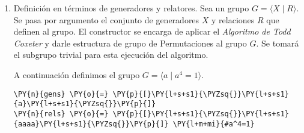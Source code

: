 \begin{itemize}
\begin{itemize}
\begin{enumerate}
    
    \begin{tcolorbox}[breakable, size=fbox, boxrule=1pt, pad at break*=1mm,colback=cellbackground, colframe=cellborder]
\begin{Verbatim}[commandchars=\\\{\}]
\PY{n}{S} \PY{o}{=} \PY{n}{Set}\PY{p}{(}\PY{p}{\PYZob{}}\PY{l+m+mi}{0}\PY{p}{,}\PY{l+m+mi}{1}\PY{p}{,}\PY{l+m+mi}{2}\PY{p}{,}\PY{l+m+mi}{3}\PY{p}{\PYZcb{}}\PY{p}{)}
\PY{n}{F}\PY{o} {=} \PY{n}{Function}\PY{p}{(}\PY{n}{S}\PY{o}{*}\PY{n}{S}\PY{p}{,} \PY{n}{S}\PY{p}{,}\PY{k}{lambda} \PY{n}{x}\PY{p}{:} \PY{p}{(}\PY{n}{x}\PY{p}{[}\PY{l+m+mi}{0}\PY{p}{]}\PY{o}{+}\PY{n}{x}\PY{p}{[}\PY{l+m+mi}{1}\PY{p}{]}\PY{p}{)}\PY{o}{\PYZpc{}}\PY{k}{4})
\PY{n}{Z4} \PY{o}{=} \PY{n}{Group}\PY{p}{(}\PY{n}{S}\PY{p}{,}\PY{n}{F}\PY{p}{)}

\PY{n+nb}{print}\PY{p}{(}\PY{n}{Z4}\PY{p}{)}
\end{Verbatim}
\end{tcolorbox}

\begin{tcolorbox}[breakable, size=fbox, boxrule=.5pt, pad at break*=1mm, opacityfill=0]
    \begin{Verbatim}[commandchars=\\\{\}]
Group with 4 elements: \{0, 1, 2, 3\}
    \end{Verbatim}
\end{tcolorbox}

\item Definición en términos de generadores y relatores. Sea un grupo $G = \langle X \mid R\rangle$. Se pasa por argumento el conjunto de generadores $X$ y relaciones $R$ que definen al grupo. El constructor se encarga de aplicar el \textit{Algoritmo de Todd Coxeter} y darle estructura de grupo de Permutaciones al grupo $G$. Se tomará el subgrupo trivial para esta ejecución del algoritmo.


A continuación definimos el grupo $G= \langle a \mid a^4 =1 \rangle$.
    \begin{tcolorbox}[breakable, size=fbox, boxrule=1pt, pad at break*=1mm,colback=cellbackground, colframe=cellborder]
\begin{Verbatim}[commandchars=\\\{\}]
\PY{n}{gens} \PY{o}{=} \PY{p}{[}\PY{l+s+s1}{\PYZsq{}}\PY{l+s+s1}{a}\PY{l+s+s1}{\PYZsq{}}\PY{p}{]}
\PY{n}{rels} \PY{o}{=} \PY{p}{[}\PY{l+s+s1}{\PYZsq{}}\PY{l+s+s1}{aaaa}\PY{l+s+s1}{\PYZsq{}}\PY{p}{]} \PY{l+m+mi}{#a^4=1}


\end{Verbatim}
\end{tcolorbox}
\end{enumerate}
\end{itemize}
\end{itemize}
